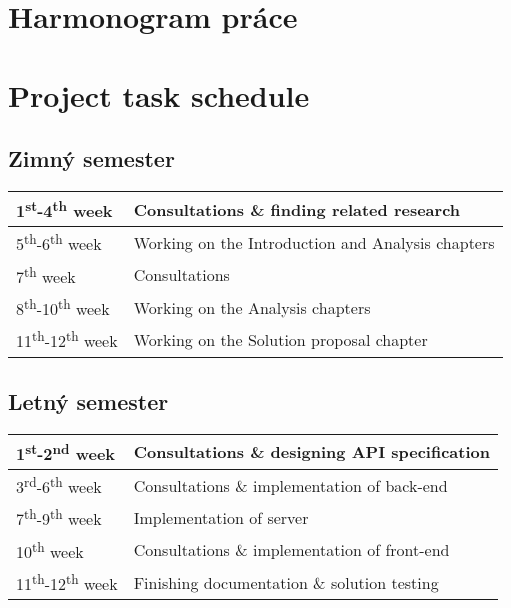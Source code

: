 \thispagestyle{empty}

\ifx\FIITlagEN\undefined
\chapter{Harmonogram práce}
\else
\chapter{Project task schedule}
\fi

\renewcommand*{\thepage}{B-\arabic{page}}

\section{Zimný semester}

\begin{tabular}{|l||l|}
\hline
1\textsuperscript{st}-4\textsuperscript{th} week    & Consultations \& finding related research  \\
\hline
5\textsuperscript{th}-6\textsuperscript{th} week    & Working on the Introduction and Analysis chapters  \\
\hline
7\textsuperscript{th} week                          & Consultations  \\
\hline
8\textsuperscript{th}-10\textsuperscript{th} week   & Working on the Analysis chapters  \\
\hline
11\textsuperscript{th}-12\textsuperscript{th} week  & Working on the Solution proposal chapter \\
\hline
\end{tabular}

\section{Letný semester}

\begin{tabular}{|l||l|}
\hline
1\textsuperscript{st}-2\textsuperscript{nd} week    & Consultations \& designing API specification  \\
\hline
3\textsuperscript{rd}-6\textsuperscript{th} week    & Consultations \& implementation of back-end  \\
\hline
7\textsuperscript{th}-9\textsuperscript{th} week    & Implementation of server  \\
\hline
10\textsuperscript{th} week                         & Consultations \& implementation of front-end  \\
\hline
11\textsuperscript{th}-12\textsuperscript{th} week  & Finishing documentation \& solution testing  \\
\hline
\end{tabular}
